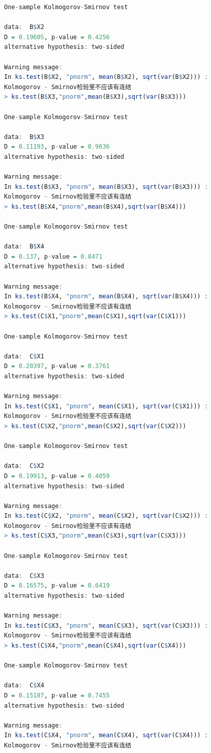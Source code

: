 \documentclass[11pt,a4paper]{ctexart}
\begin{document}
\begin{appendices}
\begin{lstlisting}[language=r]
One-sample Kolmogorov-Smirnov test

data:  B$X2
D = 0.19605, p-value = 0.4256
alternative hypothesis: two-sided

Warning message:
In ks.test(B$X2, "pnorm", mean(B$X2), sqrt(var(B$X2))) :
Kolmogorov - Smirnov检验里不应该有连结
> ks.test(B$X3,"pnorm",mean(B$X3),sqrt(var(B$X3)))

One-sample Kolmogorov-Smirnov test

data:  B$X3
D = 0.11193, p-value = 0.9636
alternative hypothesis: two-sided

Warning message:
In ks.test(B$X3, "pnorm", mean(B$X3), sqrt(var(B$X3))) :
Kolmogorov - Smirnov检验里不应该有连结
> ks.test(B$X4,"pnorm",mean(B$X4),sqrt(var(B$X4)))

One-sample Kolmogorov-Smirnov test

data:  B$X4
D = 0.137, p-value = 0.8471
alternative hypothesis: two-sided

Warning message:
In ks.test(B$X4, "pnorm", mean(B$X4), sqrt(var(B$X4))) :
Kolmogorov - Smirnov检验里不应该有连结
> ks.test(C$X1,"pnorm",mean(C$X1),sqrt(var(C$X1)))

One-sample Kolmogorov-Smirnov test

data:  C$X1
D = 0.20397, p-value = 0.3761
alternative hypothesis: two-sided

Warning message:
In ks.test(C$X1, "pnorm", mean(C$X1), sqrt(var(C$X1))) :
Kolmogorov - Smirnov检验里不应该有连结
> ks.test(C$X2,"pnorm",mean(C$X2),sqrt(var(C$X2)))

One-sample Kolmogorov-Smirnov test

data:  C$X2
D = 0.19913, p-value = 0.4059
alternative hypothesis: two-sided

Warning message:
In ks.test(C$X2, "pnorm", mean(C$X2), sqrt(var(C$X2))) :
Kolmogorov - Smirnov检验里不应该有连结
> ks.test(C$X3,"pnorm",mean(C$X3),sqrt(var(C$X3)))

One-sample Kolmogorov-Smirnov test

data:  C$X3
D = 0.16575, p-value = 0.6419
alternative hypothesis: two-sided

Warning message:
In ks.test(C$X3, "pnorm", mean(C$X3), sqrt(var(C$X3))) :
Kolmogorov - Smirnov检验里不应该有连结
> ks.test(C$X4,"pnorm",mean(C$X4),sqrt(var(C$X4)))

One-sample Kolmogorov-Smirnov test

data:  C$X4
D = 0.15187, p-value = 0.7455
alternative hypothesis: two-sided

Warning message:
In ks.test(C$X4, "pnorm", mean(C$X4), sqrt(var(C$X4))) :
Kolmogorov - Smirnov检验里不应该有连结
\end{lstlisting}

\end{appendices}
\end{document}
